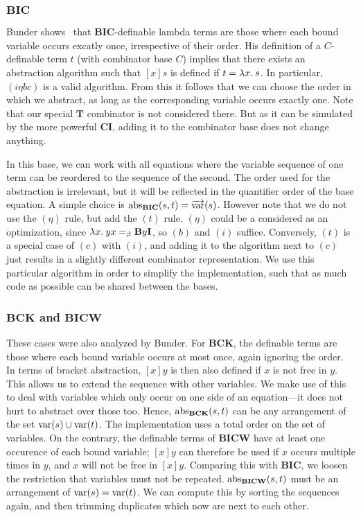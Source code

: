 \subsubsection*{$\mathbf{BIC}$}\label{subsec:base-bic}

Bunder shows~\cite{bunder96} that $\mathbf{BIC}$-definable lambda terms are
those where each bound variable occurs excatly once, irrespective of their order.
His definition of a $C$-definable term $t$ (with combinator base $C$)
implies that there exists an abstraction algorithm such that $[x]s$ is defined
if $t = \lambda x.\>s$.
In particular, $(i\eta bc)$ is a valid algorithm.
From this it follows that we can choose the order in which we abstract, as long
as the corresponding variable occurs exactly one.
Note that our special $\mathbf{T}$ combinator is not considered there.
But as it can be simulated by the more powerful $\mathbf{CI}$, adding it to the
combinator base does not change anything.

In this base, we can work with all equations where the variable sequence of
one term can be reordered to the sequence of the second.
The order used for the abstraction is irrelevant, but it will be reflected
in the quantifier order of the base equation.
A simple choice is $\operatorname{abs}_\mathbf{BIC}(s,t) = \overrightarrow{\operatorname{var}}(s)$.
However note that we do not use the $(\eta)$ rule, but add the $(t)$ rule.
$(\eta)$ could be a considered as an optimization, since
$\lambda x.\>yx =_\beta \mathbf{B}y\mathbf{I}$, so $(b)$ and $(i)$ suffice.
Conversely, $(t)$ is a special case of $(c)$ with $(i)$, and adding it to the
algorithm next to $(c)$ just results in a slightly different combinator
representation.
We use this particular algorithm in order to simplify the implementation,
such that as much code as possible can be shared between the bases. 

\subsubsection*{$\mathbf{BCK}$ and $\mathbf{BICW}$}\label{subsec:base-bck-bicw}

These cases were also analyzed by Bunder.
For $\mathbf{BCK}$, the definable terms are those where each bound variable occurs
at most once, again ignoring the order.
In terms of bracket abstraction, $[x]y$ is then also defined if $x$ is not free
in $y$.
This allows us to extend the sequence with other variables.
We make use of this to deal with variables which only occur on one side of
an equation---it does not hurt to abstract over those too.
Hence, $\operatorname{abs}_\mathbf{BCK}(s,t)$ can be any arrangement of the
set $\operatorname{var}(s) \cup \operatorname{var}(t)$.
The implementation uses a total order on the set of variables.
On the contrary, the definable terms of $\mathbf{BICW}$ have at least one
occurence of each bound variable; $[x]y$ can therefore be used if $x$ occurs
multiple times in $y$, and $x$ will not be free in $[x]y$.
Comparing this with $\mathbf{BIC}$, we loosen the restriction that variables
must not be repeated.
$\operatorname{abs}_\mathbf{BICW}(s,t)$ must be an arrangement of $\operatorname{var}(s) = \operatorname{var}(t)$.
We can compute this by sorting the sequences again, and then trimming duplicates
which now are next to each other.

